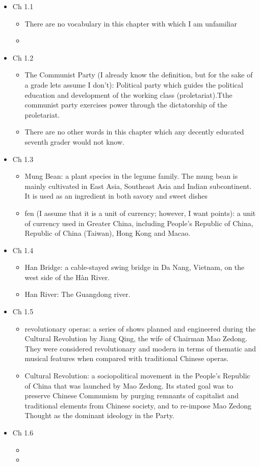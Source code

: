 \documentclass[12pt]{article}
\newcommand{\vc}[4]{
  \item Ch #1.#2
  \begin{itemize}
    \item #3
    \item #4
  \end{itemize}
}
\begin{document}
\vspace{2em}
\begin{itemize}

  \vc{1}{1}{There are no vocabulary in this chapter with which I am unfamiliar}{}

  \vc{1}{2}{The Communist Party (I already know the definition, but for the sake of a grade lets assume I don't): Political party which guides the political education and development of the working class (proletariat).Tthe communist party exercises power through the dictatorship of the proletariat.}{There are no other words in this chapter which any decently educated seventh grader would not know.}

  \vc{1}{3}{Mung Bean: a plant species in the legume family. The mung bean is mainly cultivated in East Asia, Southeast Asia and Indian subcontinent. It is used as an ingredient in both savory and sweet dishes}{fen (I assume that it is a unit of currency; however, I want points): a unit of currency used in Greater China, including People's Republic of China, Republic of China (Taiwan), Hong Kong and Macao.}

  \vc{1}{4}{Han Bridge: a cable-stayed swing bridge in Da Nang, Vietnam, on the west side of the Hàn River.}{Han River: The Guangdong river.}

  \vc{1}{5}{revolutionary operas: a series of shows planned and engineered during the Cultural Revolution by Jiang Qing, the wife of Chairman Mao Zedong. They were considered revolutionary and modern in terms of thematic and musical features when compared with traditional Chinese operas.}{Cultural Revolution: a sociopolitical movement in the People's Republic of China that was launched by Mao Zedong. Its stated goal was to preserve Chinese Communism by purging remnants of capitalist and traditional elements from Chinese society, and to re-impose Mao Zedong Thought as the dominant ideology in the Party.}

  \vc{1}{6}{}{}
\end{itemize}
\end{document}
